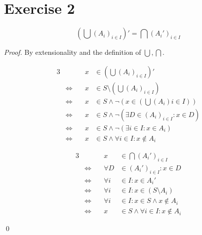\documentclass[11pt]{llncs}
\begin{document}
\section*{Exercise 2}

\begin{lemma}
  \[
    \left(\bigcup (A_i)_{i \in I}\right)' = \bigcap\left(A_i'\right)_{i \in I}
  \]
\end{lemma}
\begin{proof}
  By extensionality and the definition of $\bigcup, \bigcap$.

  \begin{minipage}[t]{0.49\textwidth}
    \begin{alignat*}{3}
                            && x &\in \left(\bigcup (A_i)_{i \in I}\right)'\\
      &\Leftrightarrow\quad & x &\in S \setminus \left(\bigcup (A_i)_{i \in I}\right)\\
      &\Leftrightarrow\quad & x &\in S \land \lnot \left(x \in \left(\bigcup (A_i){i \in I}\right)\right)\\
      &\Leftrightarrow\quad & x &\in S \land \lnot (\exists D \in (A_i)_{i \in I}: x \in D)\\
      &\Leftrightarrow\quad & x &\in S \land \lnot (\exists i \in I: x \in A_i)\\
      &\Leftrightarrow\quad & x &\in S \land \forall i \in I: x \not\in A_i
    \end{alignat*}
  \end{minipage}
  \textwidth
  \vline
  \textwidth
  \begin{minipage}[t]{0.49\textwidth}
    \begin{alignat*}{3}
                            && x &\in \bigcap\left(A_i'\right)_{i \in I}\\
      &\Leftrightarrow\quad & \forall D &\in (A_i')_{i \in I}: x \in D\\
      &\Leftrightarrow\quad & \forall i &\in I: x \in A_i'\\
      &\Leftrightarrow\quad & \forall i &\in I: x \in (S \setminus A_i)\\
      &\Leftrightarrow\quad & \forall i &\in I: x \in S \land x \not\in A_i\\
      &\Leftrightarrow\quad & x &\in S \land \forall i \in I: x \not\in A_i
    \end{alignat*}
  \end{minipage}
  \qed
\end{proof}
\end{document}

